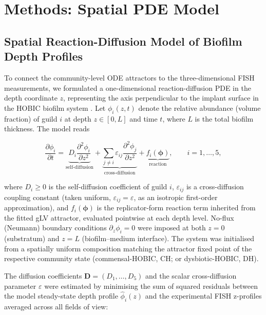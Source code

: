 
\section*{Methods: Spatial PDE Model}
\subsection{Spatial Reaction-Diffusion Model of Biofilm Depth Profiles}
\label{subsec:spatial_pde}

To connect the community-level ODE attractors to the three-dimensional FISH measurements,
we formulated a one-dimensional reaction-diffusion PDE in the depth coordinate $z$,
representing the axis perpendicular to the implant surface in the HOBIC biofilm system
\cite{heine2025}.
Let $\phi_i(z,t)$ denote the relative abundance (volume fraction) of guild $i$
at depth $z \in [0, L]$ and time $t$, where $L$ is the total biofilm thickness.
The model reads

\begin{equation}
  \frac{\partial \phi_i}{\partial t}
  = \underbrace{D_i \frac{\partial^2 \phi_i}{\partial z^2}}_{\text{self-diffusion}}
  + \underbrace{\sum_{j \neq i} \varepsilon_{ij}
      \frac{\partial^2 \phi_j}{\partial z^2}}_{\text{cross-diffusion}}
  + \underbrace{f_i(\boldsymbol{\phi})}_{\text{reaction}},
  \qquad i = 1, \ldots, 5,
\label{eq:pde_main}
\end{equation}

\noindent
where $D_i \geq 0$ is the self-diffusion coefficient of guild $i$,
$\varepsilon_{ij}$ is a cross-diffusion coupling constant (taken uniform,
$\varepsilon_{ij} = \varepsilon$, as an isotropic first-order approximation),
and $f_i(\boldsymbol{\phi})$ is the replicator-form reaction term inherited from the
fitted gLV attractor, evaluated pointwise at each depth level.
No-flux (Neumann) boundary conditions $\partial_z \phi_i = 0$ were imposed at both
$z = 0$ (substratum) and $z = L$ (biofilm--medium interface).
The system was initialised from a spatially uniform composition matching the
attractor fixed point of the respective community state (commensal-HOBIC, CH;
or dysbiotic-HOBIC, DH).

The diffusion coefficients $\mathbf{D} = (D_1, \ldots, D_5)$ and the scalar
cross-diffusion parameter $\varepsilon$ were estimated by minimising the sum of
squared residuals between the model steady-state depth profile $\hat{\phi}_i(z)$
and the experimental FISH z-profiles averaged across all fields of view:

